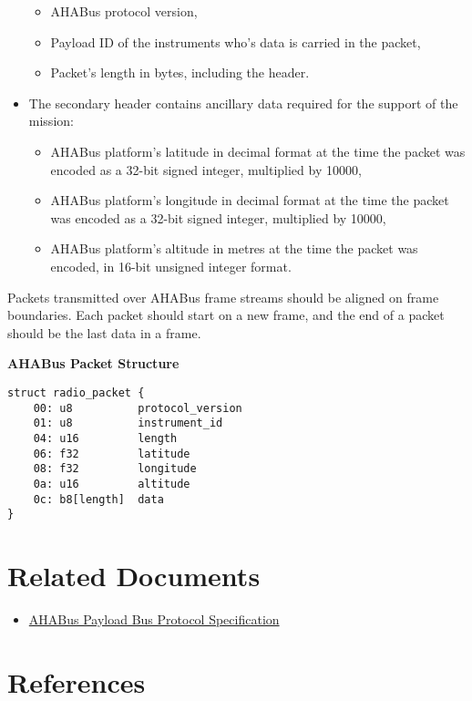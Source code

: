 \begin{appendices}
\begin{itemize}
  \begin{itemize}
  \item
    AHABus protocol version,
  \item
    Payload ID of the instruments who's data is carried in the packet,
  \item
    Packet's length in bytes, including the header.
  \end{itemize}
\item
  The secondary header contains ancillary data required for the support
  of the mission:

  \begin{itemize}
  \item
    AHABus platform's latitude in decimal format at the time the packet
    was encoded as a 32-bit signed integer, multiplied by 10000,
  \item
    AHABus platform's longitude in decimal format at the time the packet
    was encoded as a 32-bit signed integer, multiplied by 10000,
  \item
    AHABus platform's altitude in metres at the time the packet was
    encoded, in 16-bit unsigned integer format.
  \end{itemize}
\end{itemize}

Packets transmitted over AHABus frame streams should be aligned on frame
boundaries. Each packet should start on a new frame, and the end of a
packet should be the last data in a frame.

\textbf{AHABus Packet Structure}

\begin{verbatim}
struct radio_packet {
    00: u8          protocol_version
    01: u8          instrument_id
    04: u16         length
    06: f32         latitude
    08: f32         longitude
    0a: u16         altitude
    0c: b8[length]  data
}
\end{verbatim}

\section{Related Documents}\label{related-documents}

\begin{itemize}
\item
  \href{https://github.com/AHABus/src/software/payload-bus.md}{AHABus
  Payload Bus Protocol Specification}
\end{itemize}

\section{References}\label{references}


\end{appendices}
